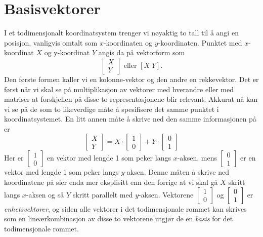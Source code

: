 \section{Basisvektorer}
I et todimensjonalt koordinatsystem trenger vi nøyaktig to tall til å angi en posisjon, vanligvis omtalt som $x$-koordinaten og $y$-koordinaten. Punktet med $x$-koordinat $X$ og y-koordinat $Y$ angis da på vektorform som 
\begin{displaymath}
	\left[\begin{array}{c} X \\ Y \end{array}\right] \text{ eller } \left[X\;Y\right].
\end{displaymath}
Den første formen kaller vi en kolonne-vektor og den andre en rekkevektor. Det er først når vi skal se på multiplikasjon av vektorer med hverandre eller med matriser at forskjellen på disse to representasjonene blir relevant. Akkurat nå kan vi se på de som to likeverdige måte å spesifisere det samme punktet i koordinatsystemet. En litt annen måte å skrive ned den samme informasjonen på er 
\begin{displaymath}
	\left[\begin{array}{c} X \\ Y \end{array}\right] = X\cdot\left[\begin{array}{c} 1 \\ 0 \end{array}\right] + Y\cdot\left[\begin{array}{c} 0 \\ 1 \end{array}\right]
\end{displaymath}
Her er $\left[\begin{array}{c} 1 \\ 0 \end{array}\right]$ en vektor med lengde 1 som peker langs $x$-aksen, mens $\left[\begin{array}{c} 0 \\ 1 \end{array}\right]$ er en vektor med lengde 1 som peker langs $y$-aksen. Denne måten å skrive ned koordinatene på sier enda mer eksplisitt enn den forrige at vi skal gå $X$ skritt langs $x$-aksen og så $Y$ skritt parallelt med $y$-aksen. Vektorene $\left[\begin{array}{c} 1 \\ 0 \end{array}\right]$ og $\left[\begin{array}{c} 0 \\ 1 \end{array}\right]$ er \emph{enhetsvektorer}, og siden alle vektorer i det todimensjonale rommet kan skrives som en lineærkombinasjon av disse to vektorene utgjør de en \emph{basis} for det todimensjonale rommet. 

